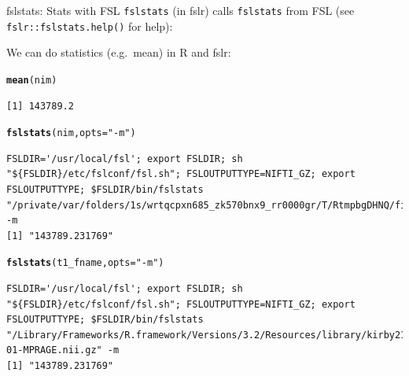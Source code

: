\documentclass[11pt]{beamer}\usepackage[]{graphicx}\usepackage[]{color}
\makeatletter
\newcommand{\hlstr}[1]{\textcolor[rgb]{0.192,0.494,0.8}{#1}}%
\newcommand{\hlstd}[1]{\textcolor[rgb]{0.345,0.345,0.345}{#1}}%
\newcommand{\hlkwc}[1]{\textcolor[rgb]{0.333,0.667,0.333}{#1}}%
\newcommand{\hlkwd}[1]{\textcolor[rgb]{0.737,0.353,0.396}{\textbf{#1}}}%
\newenvironment{kframe}{%
 \def\at@end@of@kframe{}%
 \ifinner\ifhmode%
  \def\at@end@of@kframe{\end{minipage}}%
  \begin{minipage}{\columnwidth}%
 \fi\fi%
 \def\FrameCommand##1{\hskip\@totalleftmargin \hskip-\fboxsep
 \colorbox{shadecolor}{##1}\hskip-\fboxsep
     \hskip-\linewidth \hskip-\@totalleftmargin \hskip\columnwidth}%
 \MakeFramed {\advance\hsize-\width
   \@totalleftmargin\z@ \linewidth\hsize
   \@setminipage}}%
 {\par\unskip\endMakeFramed%
 \at@end@of@kframe}
\newenvironment{knitrout}{}{} %
\makeatother
\begin{document}
\begin{frame}[fragile]{fslstats: Stats with FSL}
\verb|fslstats| (in fslr) calls \verb|fslstats| from FSL (see \verb|fslr::fslstats.help()| for help):

We can do statistics (e.g.~mean) in R and fslr:
\begin{knitrout}
\color{fgcolor}\begin{kframe}
\begin{alltt}
\hlkwd{mean}\hlstd{(nim)}
\end{alltt}
\begin{verbatim}
[1] 143789.2
\end{verbatim}
\begin{alltt}
\hlkwd{fslstats}\hlstd{(nim,} \hlkwc{opts}\hlstd{=}\hlstr{"-m"}\hlstd{)}
\end{alltt}
\begin{verbatim}
FSLDIR='/usr/local/fsl'; export FSLDIR; sh "${FSLDIR}/etc/fslconf/fsl.sh"; FSLOUTPUTTYPE=NIFTI_GZ; export FSLOUTPUTTYPE; $FSLDIR/bin/fslstats "/private/var/folders/1s/wrtqcpxn685_zk570bnx9_rr0000gr/T/RtmpbgDHNQ/file132ca176b0459.nii.gz" -m 
[1] "143789.231769"
\end{verbatim}
\begin{alltt}
\hlkwd{fslstats}\hlstd{(t1_fname,} \hlkwc{opts} \hlstd{=} \hlstr{"-m"}\hlstd{)}
\end{alltt}
\begin{verbatim}
FSLDIR='/usr/local/fsl'; export FSLDIR; sh "${FSLDIR}/etc/fslconf/fsl.sh"; FSLOUTPUTTYPE=NIFTI_GZ; export FSLOUTPUTTYPE; $FSLDIR/bin/fslstats "/Library/Frameworks/R.framework/Versions/3.2/Resources/library/kirby21/visit_1/113/113-01-MPRAGE.nii.gz" -m 
[1] "143789.231769"
\end{verbatim}
\end{kframe}
\end{knitrout}


\end{frame}
\end{document}
